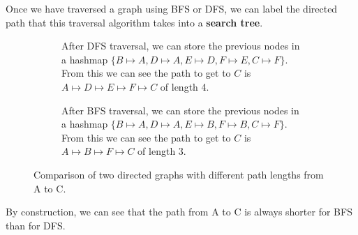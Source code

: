   \begin{definition}
    \label{def:search-trees}
    Once we have traversed a graph using BFS or DFS, we can label the directed path that this traversal algorithm takes into a \textbf{search tree}. 

    \begin{figure}[H]
      \centering
      \begin{subfigure}[b]{0.48\textwidth}
      \centering
        \caption{After DFS traversal, we can store the previous nodes in a hashmap $\{B \mapsto A, D \mapsto A, E \mapsto D, F \mapsto E, C \mapsto F\}$. From this we can see the path to get to $C$ is $A \mapsto D \mapsto E \mapsto F \mapsto C$ of length 4. }
        \label{fig:graph1}
      \end{subfigure}
      \hfill 
      \begin{subfigure}[b]{0.48\textwidth}
      \centering
        \caption{After BFS traversal, we can store the previous nodes in a hashmap $\{B \mapsto A, D \mapsto A, E \mapsto B, F \mapsto B, C \mapsto F\}$. From this we can see the path to get to $C$ is $A \mapsto B \mapsto F \mapsto C$ of length 3. }
        \label{fig:graph2}
      \end{subfigure}
      \caption{Comparison of two directed graphs with different path lengths from A to C.}
      \label{fig:graph-comparison}
    \end{figure}

    By construction, we can see that the path from A to C is always shorter for BFS than for DFS. 
  \end{definition}

